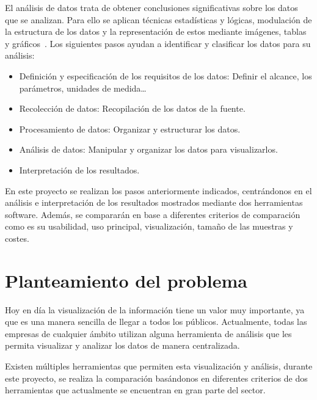 \documentclass[a4paper, 12pt]{book}
\begin{document}
El análisis de datos trata de obtener conclusiones significativas sobre los datos que se analizan. Para ello se aplican técnicas estadísticas y lógicas, modulación de la estructura de los datos y la representación de estos mediante imágenes, tablas y gráficos~\cite{aranda2009tecnicas}.
Los siguientes pasos ayudan a identificar y clasificar los datos para su análisis: 
 \begin{itemize}
        \item Definición y especificación de los requisitos de los datos: Definir el alcance, los parámetros, unidades de medida\ldots
        \item Recolección de datos: Recopilación de los datos de la fuente.
        \item Procesamiento de datos: Organizar y estructurar los datos.
        \item Análisis de datos: Manipular y organizar los datos para visualizarlos.
        \item Interpretación de los resultados.
    \end{itemize}

En este proyecto se realizan los pasos anteriormente indicados, centrándonos en el análisis e interpretación de los resultados mostrados mediante dos herramientas software. Además, se compararán en base a diferentes criterios de comparación como es su usabilidad, uso principal, visualización, tamaño de las muestras y costes. 


\section{Planteamiento del problema}
\label{sec:seccion}

Hoy en día la visualización de la información tiene un valor muy importante, ya que es una manera sencilla de llegar a todos los públicos. Actualmente, todas las empresas de cualquier ámbito utilizan alguna herramienta de análisis que les permita visualizar y analizar los datos de manera centralizada. 

Existen múltiples herramientas que permiten esta visualización y análisis, durante este proyecto, se realiza la comparación basándonos en diferentes criterios de dos herramientas que actualmente se encuentran en gran parte del sector.
\end{document}

